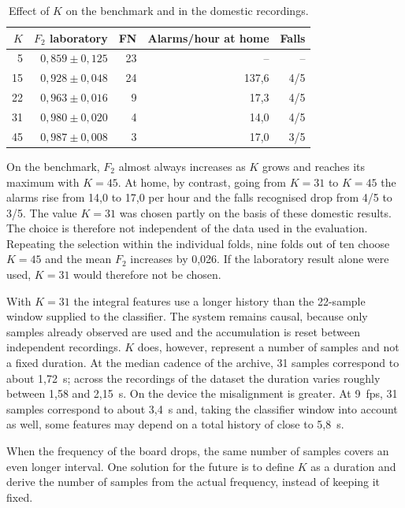 \begin{table}[ht]
\centering
\caption{Effect of $K$ on the benchmark and in the domestic recordings.}
\label{tab:effetto_k}
\begin{tabular}{rrrrr}
\toprule
$K$ &
\textbf{$F_2$ laboratory} &
\textbf{FN} &
\textbf{Alarms/hour at home} &
\textbf{Falls} \\
\midrule
5  & $0{,}859\pm0{,}125$ & 23 & --    & -- \\
15 & $0{,}928\pm0{,}048$ & 24 & 137,6 & 4/5 \\
22 & $0{,}963\pm0{,}016$ & 9  & 17,3  & 4/5 \\
31 & $0{,}980\pm0{,}020$ & 4  & 14,0  & 4/5 \\
45 & $0{,}987\pm0{,}008$ & 3  & 17,0  & 3/5 \\
\bottomrule
\end{tabular}
\end{table}

On the benchmark, $F_2$ almost always increases as $K$ grows and reaches its maximum with $K=45$. At home, by contrast, going from $K=31$ to $K=45$ the alarms rise from 14,0 to 17,0 per hour and the falls recognised drop from 4/5 to 3/5.
The value $K=31$ was chosen partly on the basis of these domestic results. The choice is therefore not independent of the data used in the evaluation. Repeating the selection within the individual folds, nine folds out of ten choose $K=45$ and the mean $F_2$ increases by 0,026. If the laboratory result alone were used, $K=31$ would therefore not be chosen.

With $K=31$ the integral features use a longer history than the 22-sample window supplied to the classifier. The system remains causal, because only samples already observed are used and the accumulation is reset between independent recordings. $K$ does, however, represent a number of samples and not a fixed duration. At the median cadence of the archive, 31 samples correspond to about 1,72~s; across the recordings of the dataset the duration varies roughly between 1,58 and 2,15~s. On the device the misalignment is greater. At 9~fps, 31 samples correspond to about 3,4~s and, taking the classifier window into account as well, some features may depend on a total history of close to 5,8~s.

When the frequency of the board drops, the same number of samples covers an even longer interval. One solution for the future is to define $K$ as a duration and derive the number of samples from the actual frequency, instead of keeping it fixed.

